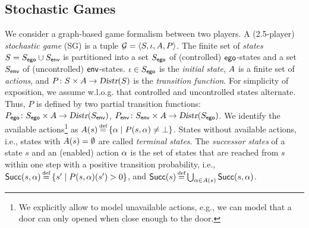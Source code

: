 \subsection{Stochastic Games}
We consider a graph-based game formalism between two players. A
(2.5-player) \emph{stochastic game} (SG) is a tuple $\mathcal{G} = \langle S,
\iota, A, P \rangle$.  The finite set of \emph{states} $S = S_{\mathsf{ego}} \cup
S_{\mathsf{env}}$ is partitioned into a set $S_{\mathsf{ego}}$ of (controlled)
$\mathsf{ego}$-states and a set $S_{\mathsf{env}}$ of (uncontrolled)
$\mathsf{env}$-states. $\iota \in S_{\mathsf{ego}}$ is the \emph{initial state}, $A$ is a
finite set of \emph{actions}, and $P\colon S \times A \rightarrow
\textsl{Distr}(S)$ is the \emph{transition function}. For simplicity of
exposition, we assume w.l.o.g. that controlled and uncontrolled
states alternate. Thus, $P$ is defined by two partial transition functions:
$P_{\mathsf{ego}}\colon S_{\mathsf{ego}} \times A \rightarrow \textsl{Distr}(S_{\mathsf{env}})$,
$P_{\mathsf{env}}\colon S_{\mathsf{env}} \times A \rightarrow \textsl{Distr}(S_{\mathsf{ego}})$. We
identify the available actions\footnote{We explicitly allow to model
unavailable actions, e.g., we can model that a door can only opened
when close enough to the door.} as $\EnAct(s) \eqdef \{ \act \mid
P(s,\act) \neq \bot \}$. States without available actions, i.e.,
states with $A(s) = \emptyset$ are called \emph{terminal states}.
The \emph{successor
states} of a state $s$ and an (enabled) action $\alpha$ is the set of
states that are reached from $s$ within one step with a positive
transition probability, i.e., $\Succ(s,\act) \eqdef \{ s' \mid
P(s,\act)(s')>0 \}$, and $\Succ(s) \eqdef\bigcup_{\act \in \EnAct(s)}
\Succ(s,\act)$.


